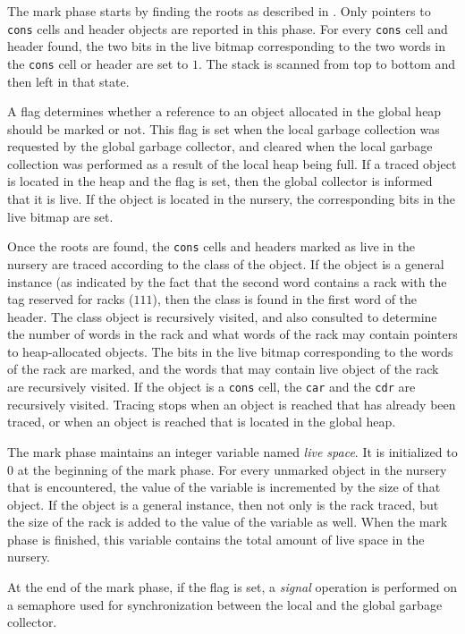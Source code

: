 The mark phase starts by finding the roots as described in
.  Only pointers to
\texttt{cons} cells and header objects are reported in this phase.
For every \texttt{cons} cell and header found, the two bits in the
live bitmap corresponding to the two words in the \texttt{cons} cell
or header are set to $1$.  The stack is scanned from top to bottom and
then left in that state.

A flag determines whether a reference to an object allocated in the
global heap should be marked or not.  This flag is set when the local
garbage collection was requested by the global garbage collector, and
cleared when the local garbage collection was performed as a result of
the local heap being full.  If a traced object is located in the heap
and the flag is set, then the global collector is informed that it is
live.  If the object is located in the nursery, the corresponding bits
in the live bitmap are set.

Once the roots are found, the \texttt{cons} cells and headers marked
as live in the nursery are traced according to the class of the
object.  If the object is a general instance (as indicated by the fact
that the second word contains a rack with the tag reserved for racks
($111$), then the class is found in the first word of the header.  The
class object is recursively visited, and also consulted to determine
the number of words in the rack and what words of the rack may contain
pointers to heap-allocated objects.  The bits in the live bitmap
corresponding to the words of the rack are marked, and the words that
may contain live object of the rack are recursively visited.  If the
object is a \texttt{cons} cell, the \texttt{car} and the \texttt{cdr}
are recursively visited.  Tracing stops when an object is reached that
has already been traced, or when an object is reached that is located
in the global heap.

The mark phase maintains an integer variable named \emph{live space}.
It is initialized to $0$ at the beginning of the mark phase.  For
every unmarked object in the nursery that is encountered, the value of
the variable is incremented by the size of that object.  If the object
is a general instance, then not only is the rack traced, but the size
of the rack is added to the value of the variable as well.  When the
mark phase is finished, this variable contains the total amount of
live space in the nursery.

At the end of the mark phase, if the flag is set, a \emph{signal}
operation is performed on a semaphore used for synchronization between
the local and the global garbage collector.


